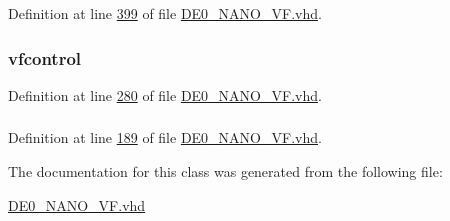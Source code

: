 Definition at line \hyperlink{_d_e0___n_a_n_o___v_f_8vhd_source_l00399}{399} of file \hyperlink{_d_e0___n_a_n_o___v_f_8vhd_source}{D\+E0\+\_\+\+N\+A\+N\+O\+\_\+\+V\+F.\+vhd}.

\hypertarget{class_d_e0___n_a_n_o___v_f_1_1_m_a_i_n_a05342d075a5ca740d21e6ef1a5509684}{}
\subsubsection[{uvf}]{ {\bfseries \textcolor{vhdlchar}{vfcontrol}\textcolor{vhdlchar}{ }} \hspace{0.3cm}{\ttfamily [Instantiation]}}\label{class_d_e0___n_a_n_o___v_f_1_1_m_a_i_n_a05342d075a5ca740d21e6ef1a5509684}


Definition at line \hyperlink{_d_e0___n_a_n_o___v_f_8vhd_source_l00280}{280} of file \hyperlink{_d_e0___n_a_n_o___v_f_8vhd_source}{D\+E0\+\_\+\+N\+A\+N\+O\+\_\+\+V\+F.\+vhd}.

\hypertarget{class_d_e0___n_a_n_o___v_f_1_1_m_a_i_n_a96f8f02a115cd76909b2395df08d3902}{}
\subsubsection[{vfcontrol}]{ {\bfseries \textcolor{vhdlchar}{ }} \hspace{0.3cm}{\ttfamily [Component]}}\label{class_d_e0___n_a_n_o___v_f_1_1_m_a_i_n_a96f8f02a115cd76909b2395df08d3902}


Definition at line \hyperlink{_d_e0___n_a_n_o___v_f_8vhd_source_l00189}{189} of file \hyperlink{_d_e0___n_a_n_o___v_f_8vhd_source}{D\+E0\+\_\+\+N\+A\+N\+O\+\_\+\+V\+F.\+vhd}.



The documentation for this class was generated from the following file\+:\begin{DoxyCompactItemize}
\item 
\hyperlink{_d_e0___n_a_n_o___v_f_8vhd}{D\+E0\+\_\+\+N\+A\+N\+O\+\_\+\+V\+F.\+vhd}\end{DoxyCompactItemize}
